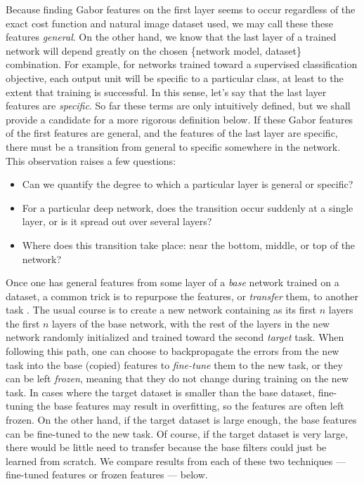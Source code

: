 Because finding Gabor features on the first layer seems to occur regardless of the exact cost function and natural image dataset used, we may call these these features \emph{general}. On the other hand, we know that the last layer of a trained network will depend greatly on the chosen \{network model, dataset\} combination. For example, for networks trained toward a supervised classification objective, each output unit will be specific to a particular class, at least to the extent that training is successful. In this sense, let's say that the last layer features are \emph{specific}. So far these terms are only intuitively defined, but we shall provide a candidate for a more rigorous definition below. 
If these Gabor features of the first features are general, and the features of the last layer are specific, there must be a transition from general to specific somewhere in the network. This observation raises a few questions:

\begin{itemize}
	\item Can we quantify the degree to which a particular layer is general or specific?
	\item For a particular deep network, does the transition occur suddenly at a single layer, or is it spread out over several layers?
	\item Where does this transition take place: near the bottom, middle, or top of the network?
\end{itemize}

Once one has general features from some layer of a \emph{base} network trained on a dataset, a common trick is to repurpose the features, or \emph{transfer} them, to another task \citep{donahue+jia-2013-arxiv}. The usual course is to create a new network containing as its first $n$ layers the first $n$ layers of the base network, with the rest of the layers in the new network randomly initialized and trained toward the second \emph{target} task. When following this path, one can choose to backpropagate the errors from the new task into the base (copied) features to \emph{fine-tune} them to the new task, or they can be left \emph{frozen}, meaning that they do not change during training on the new task. In cases where the target dataset is smaller than the base dataset, fine-tuning the base features may result in overfitting, so the features are often left frozen. On the other hand, if the target dataset is large enough, the base features can be fine-tuned to the new task. Of course, if the target dataset is very large, there would be little need to transfer because the base filters could just be learned from scratch. We compare results from each of these two techniques --- fine-tuned features or frozen features --- below.

